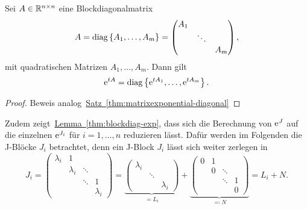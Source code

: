 \begin{lemma}\label{thm:blockdiag-exp}
    Sei $A \in \mathbb{R}^{n \times n}$ eine Blockdiagonalmatrix
    \begin{equation*}
        A = \operatorname{diag}\left\{A_1,\dots,A_m\right\}
        = \begin{pmatrix}
                A_1 &        & \\
                    & \ddots & \\
                    &        & A_m
        \end{pmatrix},
    \end{equation*}
    mit quadratischen Matrizen $A_1, \dots, A_m$.
    Dann gilt
    \begin{equation*}
        \mathrm{e}^{t A} = \operatorname{diag}\left\{ \mathrm{e}^{t A_1}, \dots,\mathrm{e}^{t A_m} \right\}.
    \end{equation*}
\end{lemma}

\begin{proof}
    Beweis analog~\hyperref[thm:matrixexponential-diagonal]{Satz~\ref*{thm:matrixexponential-diagonal}}
\end{proof}

Zudem zeigt~\hyperref[thm:blockdiag-exp]{Lemma~\ref*{thm:blockdiag-exp}},
dass sich die Berechnung von $\mathrm{e}^J$ auf die einzelnen $\mathrm{e}^{J_i}$ für $i = 1,\dots,n$ reduzieren lässt.
Dafür werden im Folgenden die J-Blöcke $J_i$ betrachtet,
denn ein J-Block $J_i$ lässt sich weiter zerlegen in
\begin{equation*}
    J_i = \begin{pmatrix}
              \lambda_i & 1         &        & \\
                        & \lambda_i & \ddots & \\
                        &           & \ddots & 1 \\
                        &           &        & \lambda_i
    \end{pmatrix}
    = \underbrace{\begin{pmatrix}
        \lambda_i &        & \\
                  & \ddots & \\
                  &        & \lambda_i
    \end{pmatrix}}_{= L_i}
    + \underbrace{\begin{pmatrix}
          0 & 1 &        & \\
            & 0 & \ddots & \\
            &   & \ddots & 1 \\
            &   &        & 0
    \end{pmatrix}}_{\eqqcolon N}
    = L_i + N.
\end{equation*}

